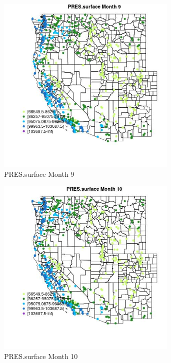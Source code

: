 \begin{figure} 
\centering  
\includegraphics[width=0.77\textwidth]{Code_Outputs/Report_ML_input_PM25_Step4_part_e_de_duplicated_aves_compiled_2019-05-14wNAs_MapObsMo9PRESsurface.jpg} 
\caption{\label{fig:Report_ML_input_PM25_Step4_part_e_de_duplicated_aves_compiled_2019-05-14wNAsMapObsMo9PRESsurface}PRES.surface Month 9} 
\end{figure} 
 

\begin{figure} 
\centering  
\includegraphics[width=0.77\textwidth]{Code_Outputs/Report_ML_input_PM25_Step4_part_e_de_duplicated_aves_compiled_2019-05-14wNAs_MapObsMo10PRESsurface.jpg} 
\caption{\label{fig:Report_ML_input_PM25_Step4_part_e_de_duplicated_aves_compiled_2019-05-14wNAsMapObsMo10PRESsurface}PRES.surface Month 10} 
\end{figure} 
 

